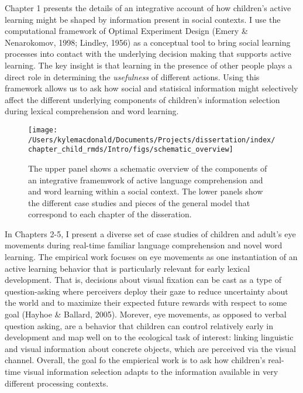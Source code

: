 \documentclass[oneside]{report}
\begin{document}
Chapter 1 presents the details of an integrative account of how
children's active learning might be shaped by information present in
social contexts. I use the computational framework of Optimal Experiment
Design (Emery \& Nenarokomov, 1998; Lindley, 1956) as a conceptual tool
to bring social learning processes into contact with the underlying
decision making that supports active learning. The key insight is that
learning in the presence of other people plays a direct role in
determining the \emph{usefulness} of different actions. Using this
framework allows us to ask how social and statisical information might
selectively affect the different underlying components of children's
information selection during lexical comprehension and word learning.
\begin{figure}[t]

{\centering \texttt{[image: /Users/kylemacdonald/Documents/Projects/dissertation/index/chapter\_child\_rmds/Intro/figs/schematic\_overview]} 

}

\caption[Schematic overview of the disseration content.]{The upper panel shows a schematic overview of the components of an integrative framemwork of active language comprehension and and word learning within a social context. The lower panels show the different case studies and pieces of the general model that correspond to each chapter of the disseration.}\label{fig:schematic-overview}
\end{figure}
In Chapters 2-5, I present a diverse set of case studies of children and
adult's eye movements during real-time familiar language comprehension
and novel word learning. The empirical work focuses on eye movements as
one instantiation of an active learning behavior that is particularly
relevant for early lexical development. That is, decisions about visual
fixation can be cast as a type of question-asking where perceivers
deploy their gaze to reduce uncertainty about the world and to maximize
their expected future rewards with respect to some goal (Hayhoe \&
Ballard, 2005). Morever, eye movements, as opposed to verbal question
asking, are a behavior that children can control relatively early in
development and map well on to the ecological task of interest: linking
linguistic and visual information about concrete objects, which are
perceived via the visual channel. Overall, the goal fo the empierical
work is to ask how children's real-time visual information selection
adapts to the information available in very different processing
contexts.
\end{document}
